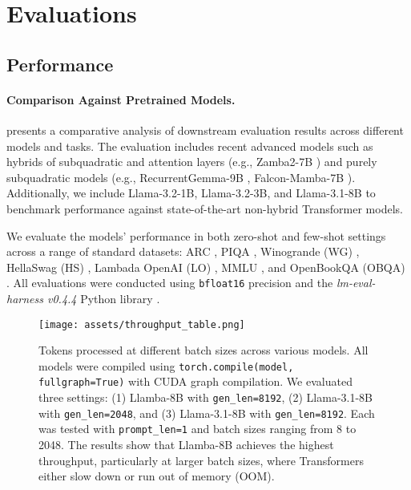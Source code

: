 \section{Evaluations}

\subsection{Performance}

\paragraph{Comparison Against Pretrained Models.}
\label{subsec:performance}
 presents a comparative analysis of downstream evaluation results across different models and tasks. The evaluation includes recent advanced models such as hybrids of subquadratic and attention layers (e.g., Zamba2-7B \citep{zamba2}) and purely subquadratic models (e.g., RecurrentGemma-9B \citep{recurrentgemma}, Falcon-Mamba-7B \citep{falcon}). Additionally, we include Llama-3.2-1B, Llama-3.2-3B, and Llama-3.1-8B to benchmark performance against state-of-the-art non-hybrid Transformer models.

We evaluate the models’ performance in both zero-shot and few-shot settings across a range of standard datasets: ARC \citep{arc}, PIQA \citep{piqa}, Winogrande (WG) \citep{winogrande}, HellaSwag (HS) \citep{hellaswag}, Lambada OpenAI (LO) \citep{lambada}, MMLU \citep{mmlu}, and OpenBookQA (OBQA) \citep{OpenBookQA}. 
All evaluations were conducted using \texttt{bfloat16} precision and the \textit{lm-eval-harness v0.4.4} Python library \citep{eval-harness}.

\begin{figure}[t!]
    \centering
    \texttt{[image: assets/throughput\_table.png]}
    \caption{
    Tokens processed at different batch sizes across various models. All models were compiled using \texttt{torch.compile(model, fullgraph=True)} with CUDA graph compilation. We evaluated three settings:
    (1) Llamba-8B with \texttt{gen\_len=8192},
    (2) Llama-3.1-8B with \texttt{gen\_len=2048}, and
    (3) Llama-3.1-8B with \texttt{gen\_len=8192}.
    Each was tested with \texttt{prompt\_len=1} and batch sizes ranging from 8 to 2048. The results show that Llamba-8B achieves the highest throughput, particularly at larger batch sizes, where Transformers either slow down or run out of memory (OOM).
    }
    \label{fig:throughput_over_batch_size}
\end{figure}


